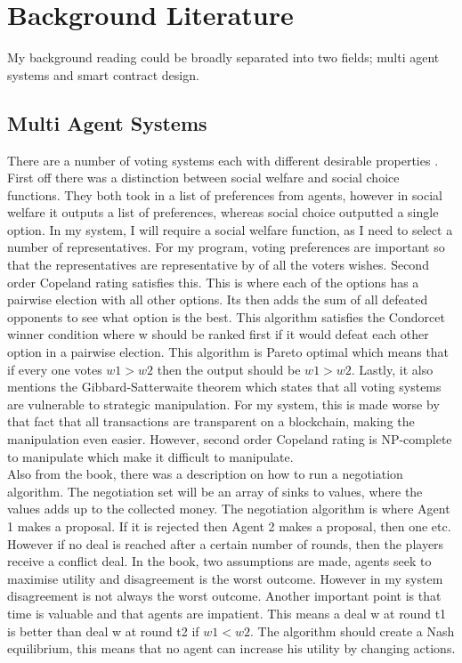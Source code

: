 \chapter{Background Literature} \label{Chapter: Background  Literature}
My background reading could be broadly separated into two fields; multi agent systems and smart contract design.
\section{Multi Agent Systems}
There are a number of voting systems each with different desirable properties \citep{Wooldridge:2009:pdflatex}. First off there was a distinction between social welfare and social choice functions. They both took in a list of preferences from agents, however in social welfare it outputs a list of preferences, whereas social choice outputted a single option. In my system, I will require a social welfare function, as I need to select a number of representatives. For my program, voting preferences are important so that the representatives are representative by of all the voters wishes. Second order Copeland rating satisfies this. This is where each of the options has a pairwise election with all other options. Its then adds the sum of all defeated opponents  to see what option is the best. This algorithm satisfies the Condorcet winner condition where w should be ranked first if it would defeat each other option in a pairwise election. This algorithm is Pareto optimal which means that if every one votes $w1>w2$ then the output should be $w1>w2$. Lastly, it also mentions the Gibbard-Satterwaite theorem which states that all voting systems are vulnerable to strategic manipulation. For my system, this is made worse by that fact that all transactions are transparent on a blockchain, making the manipulation even easier. However, second order Copeland rating is NP-complete to manipulate which make it difficult to manipulate.  \\
Also from the book, there was a description on how to run a negotiation algorithm. The negotiation set will be an array of sinks to values, where the values adds up to the collected money. The negotiation algorithm is where Agent 1 makes a proposal. If it is rejected then Agent 2 makes a proposal, then one etc. However if no deal is reached after a certain number of rounds, then the players receive a conflict deal. In the book, two assumptions are made, agents seek to maximise utility and disagreement is the worst outcome. However in my system disagreement is not always the worst outcome. Another important point is that time is valuable and that agents are impatient. This means a deal w at round t1 is better than deal w at round t2 if $w1<w2$. The algorithm should create a Nash equilibrium, this means that no agent can increase his utility by changing actions. \\
